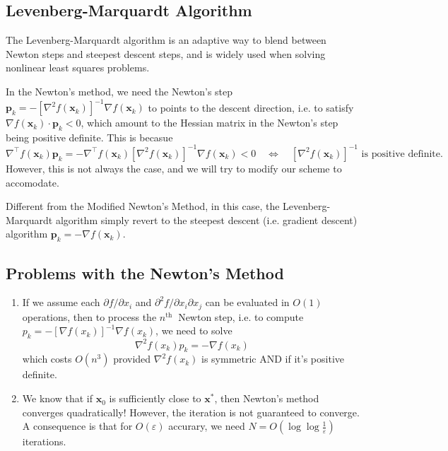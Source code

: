 \documentclass[11pt]{article}
\theoremstyle{plain} %
\newenvironment{topic}
{\color{C2}\normalfont\begin{framed}\begingroup }
  {\endgroup\end{framed}}
\theoremstyle{remark}
\begin{document}
\subsection{Levenberg-Marquardt Algorithm}
\begin{topic}
  The Levenberg-Marquardt algorithm is an adaptive way to blend between Newton
  steps and steepest descent steps, and is widely used when solving nonlinear
  least squares problems.

  In the Newton's method, we need the Newton's step $\mathbf{p}_k = -\left[\nabla^2 f(\mathbf{x}_k)\right]^{-1} \nabla f(\mathbf{x}_k)$
  to points to the descent direction, i.e. to satisfy $\nabla f(\mathbf{x}_k) \cdot \mathbf{p}_k < 0$, which amount to
  the Hessian matrix in the Newton's step being positive definite. This is becasue
  $$
    \nabla^\top f(\mathbf{x}_k) \mathbf{p}_k
    = -\nabla^{\top} f(\mathbf{x}_k)\left[\nabla^2 f(\mathbf{x}_k)\right]^{-1} \nabla f(\mathbf{x}_k) < 0
    \quad \Longleftrightarrow \quad
    \left[\nabla^2 f(\mathbf{x}_k)\right]^{-1} \text{ is positive definite.}
  $$
  However, this is not always the case, and we will try to modify our scheme to
  accomodate.

  Different from the Modified Newton's Method, in this case, the Levenberg-Marquardt algorithm simply revert to
  the steepest descent (i.e. gradient descent) algorithm $\mathbf{p}_k = - \nabla f(\mathbf{x}_k)$.


\end{topic}


\subsection{Problems with the Newton's Method}
\begin{topic}
  \begin{enumerate}
    \item If we assume each $\partial f / \partial x_i$ and $\partial^2 f /
            \partial x_i \partial x_j$ can be evaluated in $O(1)$ operations, then to
          process the $n^{\text {th }}$ Newton step, i.e. to compute $p_k=-\left[\nabla
              f\left(x_k\right)\right]^{-1} \nabla f\left(x_k\right)$, we need to solve
          $$
            \nabla^2 f\left(x_k\right) p_k=-\nabla f\left(x_k\right)
          $$
          which costs $O\left(n^3\right)$ provided $\nabla^2 f\left(x_k\right)$ is
          symmetric AND if it's positive definite.
    \item We know that if $\mathbf{x}_0$ is sufficiently close to
          $\mathbf{x}^*$, then Newton's method converges quadratically! However, the
          iteration is not guaranteed to converge. A consequence is that for $O(\varepsilon)$ accurary, we need $N=O\left(\log \log \frac{1}{\varepsilon}\right)$ iterations.
  \end{enumerate}
\end{topic}
\end{document}
